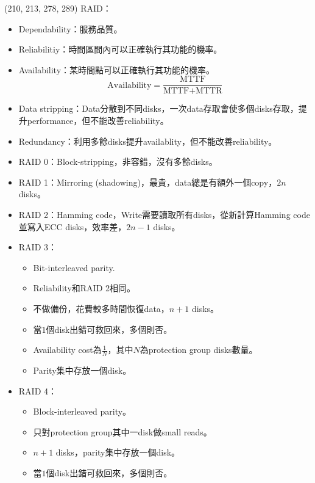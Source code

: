 \item \begin{theorem}{(210, 213, 278, 289)} RAID：\begin{itemize}
        \item Dependability：服務品質。
        \item Reliabilitiy：時間區間內可以正確執行其功能的機率。
        \item Availability：某時間點可以正確執行其功能的機率。\begin{equation}
            \text{Availability} = \frac{\text{MTTF}}{\text{MTTF} + \text{MTTR}}
        \end{equation}
        \item Data stripping：Data分散到不同disks，一次data存取會使多個disks存取，提升performance，但不能改善reliability。
        \item Redundancy：利用多餘disks提升availablity，但不能改善reliability。
        \item RAID 0：Block-stripping，非容錯，沒有多餘disks。
        \item RAID 1：Mirroring (shadowing)，最貴，data總是有額外一個copy，$2n$ disks。
        \item RAID 2：Hamming code，Write需要讀取所有disks，從新計算Hamming code並寫入ECC disks，效率差，$2n - 1$ disks。
        \item RAID 3：\begin{itemize}
            \item Bit-interleaved parity.
            \item Reliability和RAID 2相同。
            \item 不做備份，花費較多時間恢復data，$n + 1$ disks。
            \item 當$1$個disk出錯可救回來，多個則否。
            \item Availability cost為$\frac{1}{N}$，其中$N$為protection group disks數量。
            \item Parity集中存放一個disk。
        \end{itemize}
        \item RAID 4：\begin{itemize}
            \item Block-interleaved parity。
            \item 只對protection group其中一disk做small reads。
            \item $n + 1$ disks，parity集中存放一個disk。
            \item 當$1$個disk出錯可救回來，多個則否。

\end{itemize}
\end{itemize}
\end{theorem}
